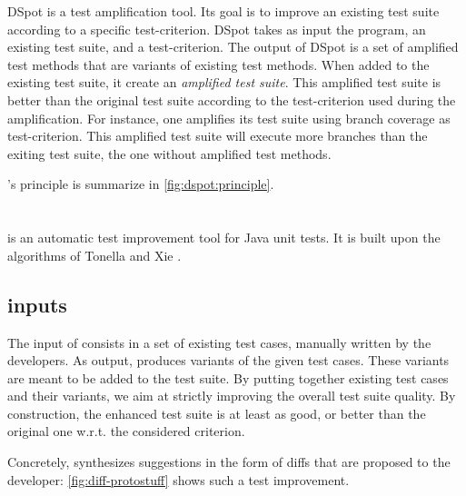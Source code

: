 DSpot is a test amplification tool.
Its goal is to improve an existing test suite according to a specific test-criterion.
DSpot takes as input the program, an existing test suite, and a test-criterion. 
The output of DSpot is a set of amplified test methods that are variants of existing test methods.
When added to the existing test suite, it create an \emph{amplified test suite}.
This amplified test suite is better than the original test suite according to the test-criterion used during the amplification.
For instance, one amplifies its test suite using branch coverage as test-criterion.
This amplified test suite will execute more branches than the exiting test suite, \ie the one without amplified test methods.

\dspot's principle is summarize in \autoref{fig:dspot:principle}.

\section{\dspot}

\dspot is an automatic test improvement tool for Java unit tests. It is built upon the algorithms of Tonella \cite{tonella} and Xie \cite{TaoXie2006}.

\subsection{\dspot inputs}

The input of \dspot consists in a set of existing test cases, manually written by the developers.
As output, \dspot produces variants of the given test cases. These variants are meant to be added to the test suite. By putting together existing test cases and their variants, we aim at strictly improving the overall test suite quality. By construction, the enhanced test suite is at least as good, or better than the original one w.r.t. the considered criterion.

Concretely, \dspot synthesizes suggestions in the form of diffs that are proposed to the developer: \autoref{fig:diff-protostuff} shows such a test improvement.  

